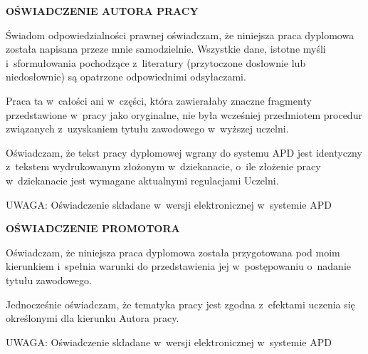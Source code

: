 \begin{center}
    \large\textbf{\MakeUppercase{OŚWIADCZENIE AUTORA PRACY}}\\
    \vspace{1cm}
\end{center}

Świadom odpowiedzialności prawnej oświadczam, że niniejsza praca dyplomowa została napisana przeze mnie samodzielnie. Wszystkie dane, istotne myśli i~sformułowania pochodzące z~literatury (przytoczone dosłownie lub niedosłownie) są opatrzone odpowiednimi odsyłaczami.
\par
Praca ta w~całości ani w~części, która zawierałaby znaczne fragmenty przedstawione w~pracy jako oryginalne, nie była wcześniej przedmiotem procedur związanych z~uzyskaniem tytułu zawodowego w~wyższej uczelni.
\par
Oświadczam, że tekst pracy dyplomowej wgrany do systemu APD jest identyczny z~tekstem wydrukowanym złożonym w~dziekanacie, o~ile złożenie pracy w~dziekanacie jest wymagane aktualnymi regulacjami Uczelni.
\par
\vspace{1cm}
\noindent UWAGA: Oświadczenie składane w~wersji elektronicznej w~systemie APD

\begin{center}
    \vspace{1cm}
    \large\textbf{\MakeUppercase{OŚWIADCZENIE PROMOTORA}}\\
    \vspace{1cm}
\end{center}

Oświadczam, że niniejsza praca dyplomowa została przygotowana pod moim kierunkiem i~spełnia warunki do przedstawienia jej w~postępowaniu o~nadanie tytułu zawodowego.
\par
Jednocześnie oświadczam, że tematyka pracy jest zgodna z~efektami uczenia się określonymi dla kierunku Autora pracy.
\par
\vspace{1cm}
\noindent UWAGA: Oświadczenie składane w~wersji elektronicznej w~systemie APD

\thispagestyle{normal}
